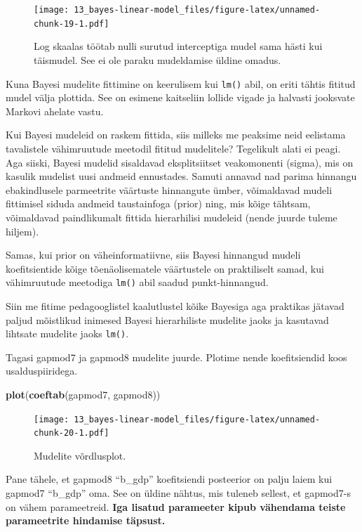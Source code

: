 \documentclass[]{book}
\newenvironment{Shaded}{\begin{snugshade}}{\end{snugshade}}
\newcommand{\KeywordTok}[1]{\textcolor[rgb]{0.13,0.29,0.53}{\textbf{#1}}}
\newcommand{\NormalTok}[1]{#1}
\begin{document}
\begin{figure}
\centering
\texttt{[image: 13\_bayes-linear-model\_files/figure-latex/unnamed-chunk-19-1.pdf]}
\caption{\label{fig:unnamed-chunk-19}Log skaalas töötab nulli surutud
interceptiga mudel sama hästi kui täismudel. See ei ole paraku
mudeldamise üldine omadus.}
\end{figure}

Kuna Bayesi mudelite fittimine on keerulisem kui \texttt{lm()} abil, on
eriti tähtis fititud mudel välja plottida. See on esimene kaitseliin
lollide vigade ja halvasti jooksvate Markovi ahelate vastu.

Kui Bayesi mudeleid on raskem fittida, siis milleks me peaksime neid
eelistama tavalistele vähimruutude meetodil fititud mudelitele?
Tegelikult alati ei peagi. Aga siiski, Bayesi mudelid sisaldavad
eksplitsiitset veakomonenti (sigma), mis on kasulik mudelist uusi
andmeid ennustades. Samuti annavad nad parima hinnangu ebakindlusele
parmeetrite väärtuste hinnangute ümber, võimaldavad mudeli fittimisel
siduda andmeid taustainfoga (prior) ning, mis kõige tähtsam, võimaldavad
paindlikumalt fittida hierarhilisi mudeleid (nende juurde tuleme
hiljem).

Samas, kui prior on väheinformatiivne, siis Bayesi hinnangud mudeli
koefitsientide kõige tõenäolisematele väärtustele on praktiliselt samad,
kui vähimruutude meetodiga \texttt{lm()} abil saadud punkt-hinnangud.

Siin me fitime pedagooglistel kaalutlustel kõike Bayesiga aga praktikas
jätavad paljud mõistlikud inimesed Bayesi hierarhiliste mudelite jaoks
ja kasutavad lihtsate mudelite jaoks \texttt{lm()}.

Tagasi gapmod7 ja gapmod8 mudelite juurde. Plotime nende koefitsiendid
koos usalduspiiridega.

\begin{Shaded}
\begin{Highlighting}[]
\KeywordTok{plot}\NormalTok{(}\KeywordTok{coeftab}\NormalTok{(gapmod7, gapmod8))}
\end{Highlighting}
\end{Shaded}

\begin{figure}
\centering
\texttt{[image: 13\_bayes-linear-model\_files/figure-latex/unnamed-chunk-20-1.pdf]}
\caption{\label{fig:unnamed-chunk-20}Mudelite võrdlusplot.}
\end{figure}

Pane tähele, et gapmod8 ``b\_gdp'' koefitsiendi posteerior on palju
laiem kui gapmod7 ``b\_gdp'' oma. See on üldine nähtus, mis tuleneb
sellest, et gapmod7-s on vähem parameetreid. \textbf{Iga lisatud
parameeter kipub vähendama teiste parameetrite hindamise täpsust.}
\end{document}
